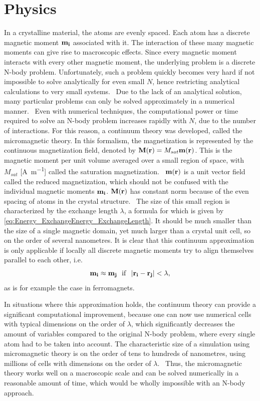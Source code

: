 \documentclass[11pt,a4paper,english]{article}
\begin{document}
\section{Physics}
In a crystalline material, the atoms are evenly spaced. Each atom has a discrete magnetic moment $\vb{m_i}$ associated with it. The interaction of these many magnetic moments can give rise to macroscopic effects. Since every magnetic moment interacts with every other magnetic moment, the underlying problem is a discrete N-body problem. Unfortunately, such a problem quickly becomes very hard if not impossible to solve analytically for even small $N$, hence restricting analytical calculations to very small systems.~\cite{abert2013discrete} Due to the lack of an analytical solution, many particular problems can only be solved approximately in a numerical manner.~\cite{abert2013discrete} Even with numerical techniques, the computational power or time required to solve an N-body problem increases rapidly with $N$, due to the number of interactions. For this reason, a continuum theory was developed, called the micromagnetic theory. In this formalism, the magnetization is represented by the continuous magnetization field, denoted by $\vb{M}(\vb{r}) = M_{sat} \vb{m}(\vb{r})$. This is the magnetic moment per unit volume averaged over a small region of space, with $M_{sat}$ [\si{\ampere\per\metre}] called the saturation magnetization.~\cite{Gilbert1956} $\vb{m}(\vb{r})$ is a unit vector field called the reduced magnetization, which should not be confused with the individual magnetic moments $\vb{m_i}$. $\vb{M}(\vb{r})$ has constant norm because of the even spacing of atoms in the crystal structure.~\cite{abert2013discrete}
The size of this small region is characterized by the exchange length $\lambda$, a formula for which is given by \cref{eq:Energy_ExchangeEnergy_ExchangeLength}. It should be much smaller than the size of a single magnetic domain, yet much larger than a crystal unit cell, so on the order of several nanometres. It is clear that this continuum approximation is only applicable if locally all discrete magnetic moments try to align themselves parallel to each other, i.e.
\begin{equation}
    \vb{m_i} \approx \vb{m_j}~~\mathrm{if}~~\abs{\vb{r_i} - \vb{r_j}} < \lambda \mathrm{,}
\end{equation}
as is for example the case in ferromagnets.~\cite{abert2013discrete} \par
In situations where this approximation holds, the continuum theory can provide a significant computational improvement, because one can now use numerical cells with typical dimensions on the order of $\lambda$, which significantly decreases the amount of variables compared to the original N-body problem, where every single atom had to be taken into account. The characteristic size of a simulation using micromagnetic theory is on the order of tens to hundreds of nanometres, using millions of cells with dimensions on the order of $\lambda$.~\cite{abert2013discrete} Thus, the micromagnetic theory works well on a macroscopic scale and can be solved numerically in a reasonable amount of time, which would be wholly impossible with an N-body approach.
\end{document}

